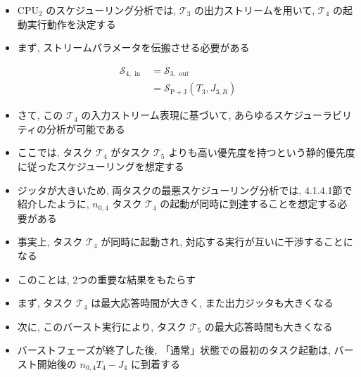 \begin{frame}{}
    \begin{itemize}
        \item $\mathrm{CPU}_{2}$ のスケジューリング分析では, $\mathcal{T}_{3}$ の出力ストリームを用いて, $\mathcal{T}_{4}$ の起動実行動作を決定する
        \item まず, ストリームパラメータを伝搬させる必要がある

    \end{itemize}
    \begin{equation*}
        \begin{aligned}
            \mathcal{S}_{4, \text { in }} & =\mathcal{S}_{3, \text { out }}                                  \\
                                          & =\mathcal{S}_{\mathrm{P}+\mathrm{J}}\left(T_{3}, J_{3, R}\right)
        \end{aligned}
    \end{equation*}
\end{frame}

\begin{frame}{}
    \begin{itemize}
        \item さて, この $\mathcal{T}_{4}$ の入力ストリーム表現に基づいて, あらゆるスケジューラビリティの分析が可能である
        \item ここでは, タスク $\mathcal{T}_{4}$ がタスク $\mathcal{T}_{5}$ よりも高い優先度を持つという静的優先度に従ったスケジューリングを想定する
    \end{itemize}
\end{frame}

\begin{frame}{}
\end{frame}

\begin{frame}{}
    \begin{itemize}
        \item ジッタが大きいため, 両タスクの最悪スケジューリング分析では, 4.1.4.1節で紹介したように, $n_{0,4}$ タスク $\mathcal{T}_{4}$ の起動が同時に到達することを想定する必要がある
        \item 事実上, タスク $\mathcal{T}_{4}$ が同時に起動され, 対応する実行が互いに干渉することになる
        \item このことは, 2つの重要な結果をもたらす
        \item まず, タスク $\mathcal{T}_{4}$ は最大応答時間が大きく, また出力ジッタも大きくなる
        \item 次に, このバースト実行により, タスク $\mathcal{T}_{5}$ の最大応答時間も大きくなる
        \item バーストフェーズが終了した後, 「通常」状態での最初のタスク起動は, バースト開始後の $n_{0,4} T_{4}-J_{4}$ に到着する
    \end{itemize}
\end{frame}

